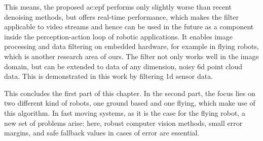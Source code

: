 This means, the proposed \gls{ac:epf} performs only slightly worse than recent denoising methods, but offers real-time performance, which makes the filter applicable to video streams and hence can be used in the future as a component inside the perception-action loop of robotic applications.
It enables image processing and data filtering on embedded hardware, for example in flying robots, which is another research area of ours.
The filter not only works well in the image domain, but can be extended to data of any dimension, \eg noisy 6d point cloud data.
This is demonstrated in this work by filtering 1d sensor data.

This concludes the first part of this chapter.
In the second part, the focus lies on two different kind of robots, one ground based and one flying, which make use of this algorithm.
In fast moving systems, as it is the case for the flying robot, a new set of problems arise: here, robust computer vision methods, small error margins, and safe fallback values in cases of error are essential.
